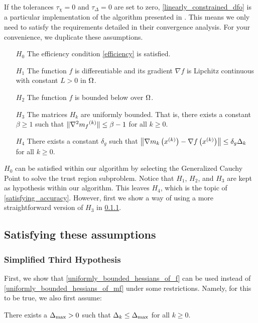 If the tolerances $\tau_{\chi} = 0$ and $\tau_{\Delta} = 0$ are set to zero, \cref{linearly_constrained_dfo} is a particular implementation of the algorithm presented in \cite{doi:10.1080/10556788.2015.1026968}.
This means we only need to satisfy the requirements detailed in their convergence analysis.
For your convenience, we duplicate these assumptions.
\begin{itemize}
\item[$H_0$] The efficiency condition \cref{efficiency} is satisfied.
\item[$H_1$] The function $f$ is differentiable and its gradient $\nabla f$ is Lipchitz continuous with constant $L > 0$ in $\Omega$.
\item[$H_2$] The function $f$ is bounded below over $\Omega$.
\item[$H_3$] The matrices $H_k$ are uniformly bounded. That is, there exists a constant $\beta \ge 1$ such that $\|\nabla^2 {{m}_f}^{(k)}\| \le \beta - 1$ for all $k \ge 0$.
\item[$H_4$] There exists a constant $\delta_g$ such that $\left\|\nabla m_k\left(x^{(k)}\right) - \nabla f\left(x^{(k)}\right)\right\| \le \delta_g \Delta_k$ for all $k \ge 0$.
\end{itemize}

$H_0$ can be satisfied within our algorithm by selecting the Generalized Cauchy Point \cite{Conn:2000:TM:357813} to solve the trust region subproblem.
Notice that $H_1$, $H_2$, and $H_3$  are kept as hypothesis within our algorithm.
This leaves $H_4$, which is the topic of \cref{satisfying_accuracy}.
However, first we show a way of using a more straightforward version of $H_3$ in \cref{simpler_h3}.

\subsection{Satisfying these assumptions}

\subsubsection{Simplified Third Hypothesis}
\label{simpler_h3}
First, we show that \cref{uniformly_bounded_hessians_of_f} can be used instead of \cref{uniformly_bounded_hessians_of_mf} under some restrictions.
Namely, for this to be true, we also first assume:
\begin{assumption}
\label{delta_max}
There exists a ${\Delta_{\textrm{max}}} > 0$ such that $\Delta_k \le {\Delta_{\textrm{max}}}$ for all $k \ge 0$.
\end{assumption}

